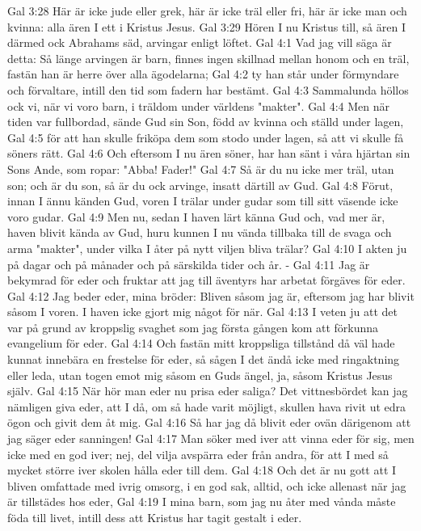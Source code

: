 Gal 3:28  Här är icke jude eller grek, här är icke träl eller fri, här är icke man och kvinna: alla ären I ett i Kristus Jesus.
Gal 3:29  Hören I nu Kristus till, så ären I därmed ock Abrahams säd, arvingar enligt löftet.
Gal 4:1  Vad jag vill säga är detta: Så länge arvingen är barn, finnes ingen skillnad mellan honom och en träl, fastän han är herre över alla ägodelarna;
Gal 4:2  ty han står under förmyndare och förvaltare, intill den tid som fadern har bestämt.
Gal 4:3  Sammalunda höllos ock vi, när vi voro barn, i träldom under världens "makter".
Gal 4:4  Men när tiden var fullbordad, sände Gud sin Son, född av kvinna och ställd under lagen,
Gal 4:5  för att han skulle friköpa dem som stodo under lagen, så att vi skulle få söners rätt.
Gal 4:6  Och eftersom I nu ären söner, har han sänt i våra hjärtan sin Sons Ande, som ropar: "Abba! Fader!"
Gal 4:7  Så är du nu icke mer träl, utan son; och är du son, så är du ock arvinge, insatt därtill av Gud.
Gal 4:8  Förut, innan I ännu känden Gud, voren I trälar under gudar som till sitt väsende icke voro gudar.
Gal 4:9  Men nu, sedan I haven lärt känna Gud och, vad mer är, haven blivit kända av Gud, huru kunnen I nu vända tillbaka till de svaga och arma "makter", under vilka I åter på nytt viljen bliva trälar?
Gal 4:10  I akten ju på dagar och på månader och på särskilda tider och år. -
Gal 4:11  Jag är bekymrad för eder och fruktar att jag till äventyrs har arbetat förgäves för eder.
Gal 4:12  Jag beder eder, mina bröder: Bliven såsom jag är, eftersom jag har blivit såsom I voren. I haven icke gjort mig något för när.
Gal 4:13  I veten ju att det var på grund av kroppslig svaghet som jag första gången kom att förkunna evangelium för eder.
Gal 4:14  Och fastän mitt kroppsliga tillstånd då väl hade kunnat innebära en frestelse för eder, så sågen I det ändå icke med ringaktning eller leda, utan togen emot mig såsom en Guds ängel, ja, såsom Kristus Jesus själv.
Gal 4:15  När hör man eder nu prisa eder saliga? Det vittnesbördet kan jag nämligen giva eder, att I då, om så hade varit möjligt, skullen hava rivit ut edra ögon och givit dem åt mig.
Gal 4:16  Så har jag då blivit eder ovän därigenom att jag säger eder sanningen!
Gal 4:17  Man söker med iver att vinna eder för sig, men icke med en god iver; nej, del vilja avspärra eder från andra, för att I med så mycket större iver skolen hålla eder till dem.
Gal 4:18  Och det är nu gott att I bliven omfattade med ivrig omsorg, i en god sak, alltid, och icke allenast när jag är tillstädes hos eder,
Gal 4:19  I mina barn, som jag nu åter med vånda måste föda till livet, intill dess att Kristus har tagit gestalt i eder.
